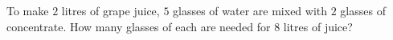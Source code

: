 To make $2$ litres of grape juice, $5$ glasses of water are mixed with $2$ glasses of concentrate. How many glasses of each are needed for $8$ litres of juice?
